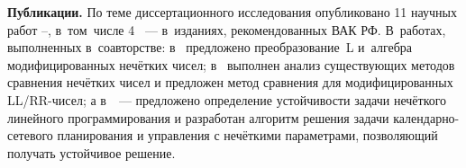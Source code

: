 \textbf{Публикации.} По теме диссертационного исследования опубликовано 11 научных работ \cite{PMTYMM}--\cite{Kanischeva}, в~том~числе 4 \cite{Kanischeva, Vorontsov_Compare, Vorontsov_PI, Vorontsov_VSTU}~--- в~изданиях, рекомендованных ВАК РФ. В~работах, выполненных в~соавторстве: в~\cite{Vorontsov_PI} предложено преобразование~L и~алгебра модифицированных нечётких чисел; в~\cite{Vorontsov_Compare} выполнен анализ существующих методов сравнения нечётких чисел и предложен метод сравнения для модифицированных LL/RR-чисел; а в~\cite{Vorontsov_VSTU}~--- предложено определение устойчивости задачи нечёткого линейного программирования и разработан алгоритм решения задачи календарно-сетевого планирования и управления с нечёткими параметрами, позволяющий получать устойчивое решение.